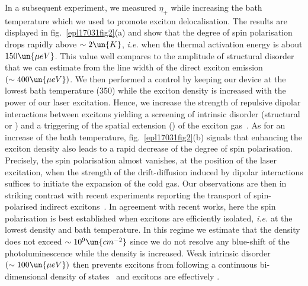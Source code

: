 \documentclass[doublecol,final]{epl2}
\begin{document}
In a subsequent experiment, we measured $\eta_{+}$ while increasing the bath temperature which we used to promote exciton delocalisation. The results are displayed in fig.~\ref{epl17031fig2}(a) and show that the degree of spin polarisation drops rapidly above $\sim 2\un{K}$, \textit{i.e.} when the thermal activation energy is about $150\un{\mu eV}$. This value well compares to the amplitude of structural disorder that we can estimate from the line width of the direct exciton emission $(\sim 400\un{\mu eV})$. We then performed a control  by keeping our device at the lowest bath temperature (350) while the exciton density is increased with the power of our laser excitation. Hence, we increase the strength of repulsive dipolar interactions between excitons yielding a screening of intrinsic disorder (structural or ) and a triggering of the spatial extension () of the exciton gas~\cite{epl17031bib20,epl17031bib21,epl17031bib22}. As for an increase of the bath temperature, fig.~\ref{epl17031fig2}(b) signals that enhancing the exciton density also leads to a rapid decrease of the degree of spin polarisation. Precisely, the spin polarisation almost vanishes, at the position of the laser excitation, when the strength of the drift-diffusion induced by dipolar interactions suffices to initiate the expansion of the cold gas. Our observations are then in striking contrast with recent experiments reporting the transport of spin-polarised indirect excitons~\cite{epl17031bib23}. In agreement with recent works\cite{epl17031bib13}, here the spin polarisation is best established when excitons are efficiently isolated, \textit{i.e.} at the lowest density and bath temperature. In this regime we estimate that the density does not exceed $\sim 10^9\un{cm^{-2}}$ since we do not resolve any blue-shift of the photoluminescence while the density is increased. Weak intrinsic disorder $(\sim 100\un{\mu eV})$ then prevents excitons from following a continuous bi-dimensional density of states~\cite{epl17031bib20,epl17031bib21} and excitons are effectively .
\end{document}
